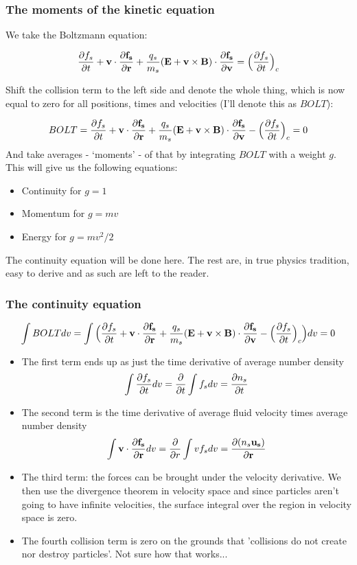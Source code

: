 \documentclass[PlasmaNotes.tex]{subfiles}
\begin{document}
\subsubsection{The moments of the kinetic equation}

We take the Boltzmann equation:

\[ \frac{\partial f_s}{\partial t} + \mathbf{v} \cdot \mathbf{\frac{\partial f_s}{\partial r}} + \frac{q_s}{m_s}\mathbf{(E+\mathbf{v} \times \mathbf{B})} \cdot \mathbf{\frac{\partial f_s}{\partial v}} = \Big(\frac{\partial f_s}{\partial t}\Big)_c \]

Shift the collision term to the left side and denote the whole thing, which is now equal to zero for all positions, times and velocities (I'll denote this as $BOLT$):

\[BOLT = \frac{\partial f_s}{\partial t} + \mathbf{v} \cdot \mathbf{\frac{\partial f_s}{\partial r}} + \frac{q_s}{m_s}\mathbf{(E+\mathbf{v} \times \mathbf{B})} \cdot \mathbf{\frac{\partial f_s}{\partial v}} - \Big(\frac{\partial f_s}{\partial t}\Big)_c = 0  \]
And take averages - `moments' - of that by integrating $BOLT$ with a weight $g$. This will give us the following equations:
\begin{itemize}
\item Continuity for $g=1$
\item Momentum for $g=mv$
\item Energy for $g=mv^2/2$
\end{itemize}
The continuity equation will be done here. The rest are, in true physics tradition, easy to derive and as such are left to the reader.

\subsubsection{The continuity equation}

\[ \int{BOLT dv} = \int{ \Big( \frac{\partial f_s}{\partial t} + \ensuremath{\mathbf{v}} \cdot \ensuremath{\mathbf{\frac{\partial f_s}{\partial r}}} + \frac{q_s}{m_s}\ensuremath{\mathbf{(E+\mathbf{v} \times \mathbf{B})}} \cdot \ensuremath{\mathbf{\frac{\partial f_s}{\partial v}}} - \Big(\frac{\partial f_s}{\partial t}\Big)_c\Big) dv} = 0 \]

\begin{itemize}
\item The first term ends up as just the time derivative of average number density
\[ \int{\frac{\partial f_s}{\partial t} dv} = \frac{\partial }{\partial t} \int{f_s dv} = \frac{\partial n_s}{\partial t} \]
\item The second term is the time derivative of average fluid velocity times average number density
\[ \int{\ensuremath{\mathbf{v}} \cdot \ensuremath{\mathbf{\frac{\partial f_s}{\partial r}}} dv} = \frac{\partial }{\partial r} \int{v f_s dv} = \frac{\partial (n_s \mathbf{u_s})}{\partial \mathbf{r}} \]

\item The third term: the forces can be brought under the velocity derivative. We then use the divergence theorem in velocity space and since particles aren't going to have infinite velocities, the surface integral over the region in velocity space is zero.

\item The fourth collision term is zero on the grounds that 'collisions do not create nor destroy particles'. Not sure how that works...

\end{itemize}
\end{document}
